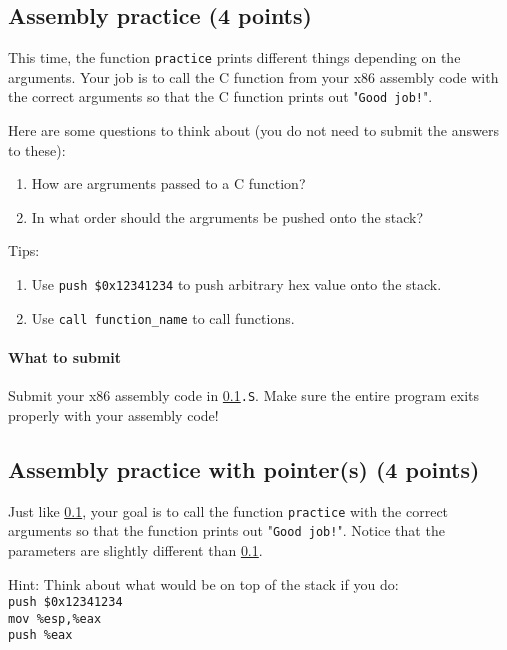 \documentclass[letterpaper,12pt]{report}
\begin{document}
{\subsection{Assembly practice (4 points) }
\label{sec:assembly_easy}

This time, the function \texttt{practice} prints different things depending on the arguments. Your job is to call the C function from your x86 assembly code with the correct arguments so that the C function prints out "\texttt{Good job!}".

\smallskip

Here are some questions to think about (you do not need to submit the answers to these):
\begin{enumerate}
\item How are argruments passed to a C function?
\item In what order should the argruments be pushed onto the stack?
\end{enumerate}

\smallskip

Tips:
\begin{enumerate}
\item Use \texttt{push \$0x12341234} to push arbitrary hex value onto the stack.
\item Use \texttt{call function\_name} to call functions.
\end {enumerate}

\paragraph{What to submit}
Submit your x86 assembly code in \texttt{\ref{sec:assembly_easy}.S}. Make sure the entire program exits properly with your assembly code!

\subsection{Assembly practice with pointer(s) (4 points) }
\label{sec:assembly_med}
Just like \texttt{\ref{sec:assembly_easy}}, your goal is to call the function \texttt{practice} with the correct arguments so that the function prints out "\texttt{Good job!}". Notice that the parameters are slightly different than \texttt{\ref{sec:assembly_easy}}.

\smallskip

Hint: Think about what would be on top of the stack if you do: \\ \texttt{push \$0x12341234} \\ \texttt{mov \%esp,\%eax} \\ \texttt{push \%eax}


}
\end{document}
